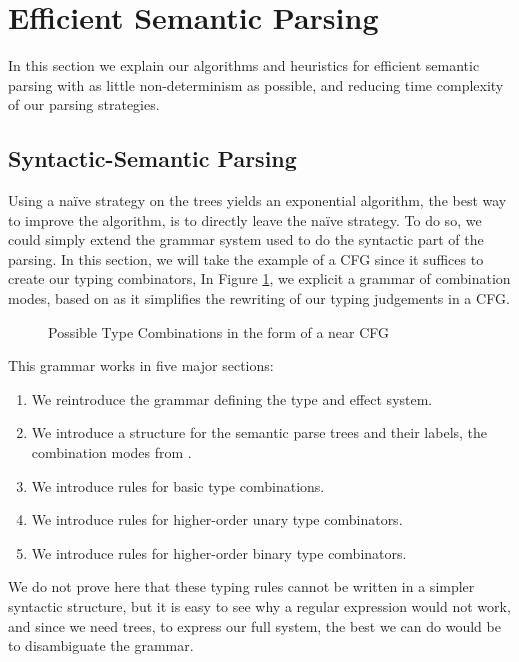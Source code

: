 \section{Efficient Semantic Parsing}
\label{sec:parsing}
In this section we explain our algorithms and heuristics for efficient semantic
parsing with as little non-determinism as possible, and reducing time complexity
of our parsing strategies.

\subsection{Syntactic-Semantic Parsing}
Using a naïve strategy on the trees yields an exponential algorithm,
the best way to improve the algorithm, is to directly leave the naïve strategy.
To do so, we could simply extend the grammar system used to do the syntactic
part of the parsing.
In this section, we will take the example of a CFG since it suffices to create
our typing combinators,
In Figure \ref{fig:combination-cfg}, we explicit a grammar of combination
modes, based on \cite{bumfordEffectdrivenInterpretationFunctors2025} as it
simplifies the rewriting of our typing judgements in a CFG.

\begin{figure}
	\centering
	
	\caption{Possible Type Combinations in the form of a near CFG}
	\label{fig:combination-cfg}
\end{figure}

This grammar works in five major sections:
\begin{enumerate}
	\item We reintroduce the grammar defining the type and effect system.
	\item We introduce a structure for the semantic parse trees and their labels,
	      the combination modes from
	      \cite{bumfordEffectdrivenInterpretationFunctors2025}.
	\item We introduce rules for basic type combinations.
	\item We introduce rules for higher-order unary type combinators.
	\item We introduce rules for higher-order binary type combinators.
\end{enumerate}

We do not prove here that these typing rules cannot be written in a simpler
syntactic structure, but it is easy to see why a regular expression would not
work, and since we need trees, to express our full system, the best we can do
would be to disambiguate the grammar.

